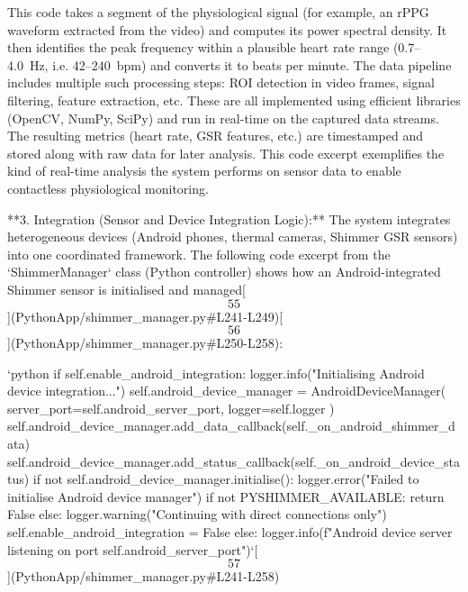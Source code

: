 \documentclass[12pt,a4paper]{article}
\begin{document}
{This code takes a segment of the physiological signal (for example, an
rPPG waveform extracted from the video) and computes its power spectral
density. It then identifies the peak frequency within a plausible heart
rate range (0.7--4.0 Hz, i.e. 42--240 bpm) and converts it to beats per
minute. The data pipeline includes multiple such processing steps: ROI
detection in video frames, signal filtering, feature extraction, etc.
These are all implemented using efficient libraries (OpenCV, NumPy,
SciPy) and run in real-time on the captured data streams. The resulting
metrics (heart rate, GSR features, etc.) are timestamped and stored
along with raw data for later analysis. This code excerpt exemplifies
the kind of real-time analysis the system performs on sensor data to
enable contactless physiological monitoring.

**3. Integration (Sensor and Device Integration Logic):** The system
integrates heterogeneous devices (Android phones, thermal cameras,
Shimmer GSR sensors) into one coordinated framework. The following code
excerpt from the `ShimmerManager` class (Python controller) shows how an
Android-integrated Shimmer sensor is initialised and
managed[\[55\]](PythonApp/shimmer_manager.py#L241-L249)[\[56\]](PythonApp/shimmer_manager.py#L250-L258):

`python if self.enable_android_integration: logger.info("Initialising Android device integration...") self.android_device_manager = AndroidDeviceManager( server_port=self.android_server_port, logger=self.logger ) self.android_device_manager.add_data_callback(self._on_android_shimmer_data) self.android_device_manager.add_status_callback(self._on_android_device_status) if not self.android_device_manager.initialise(): logger.error("Failed to initialise Android device manager") if not PYSHIMMER_AVAILABLE: return False else: logger.warning("Continuing with direct connections only") self.enable_android_integration = False else: logger.info(f"Android device server listening on port {self.android_server_port}")`[\[57\]](PythonApp/shimmer_manager.py#L241-L258)

}
\end{document}
